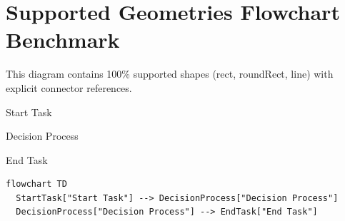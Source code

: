 \documentclass[11pt,a4paper]{article}
\begin{document}
\section{Supported Geometries Flowchart Benchmark}

This diagram contains 100\% supported shapes (rect, roundRect, line) with explicit connector references.

Start Task

Decision Process

End Task

\begin{figure}[h]
\end{figure}

\begin{verbatim}
flowchart TD
  StartTask["Start Task"] --> DecisionProcess["Decision Process"]
  DecisionProcess["Decision Process"] --> EndTask["End Task"]
\end{verbatim}
\end{document}
